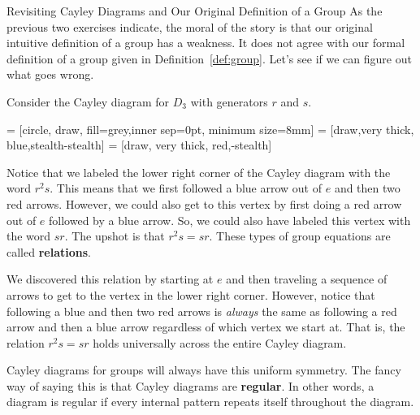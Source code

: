 \begin{section}{Revisiting Cayley Diagrams and Our Original Definition of a Group}
As the previous two exercises indicate, the moral of the story is that our original intuitive definition of a group has a weakness.  It does not agree with our formal definition of a group given in Definition~\ref{def:group}.  Let's see if we can figure out what goes wrong.

Consider the Cayley diagram for \(D_3\) with generators \(r\) and \(s\).

 = [circle, draw, fill=grey,inner sep=0pt, minimum size=8mm]
 = [draw,very  thick, blue,stealth-stealth]
 = [draw, very thick, red,-stealth]

\begin{center}
\end{center}

\noindent Notice that we labeled the lower right corner of the Cayley diagram with the word \(r^2s\).  This means that we first followed a blue arrow out of \(e\) and then two red arrows.  However, we could also get to this vertex by first doing a red arrow out of \(e\) followed by a blue arrow.  So, we could also have labeled this vertex with the word \(sr\).  The upshot is that \(r^2s=sr\).  These types of group equations are called \textbf{relations}.

We discovered this relation by starting at \(e\) and then traveling a sequence of arrows to get to the vertex in the lower right corner.  However, notice that following a blue and then two red arrows is \emph{always} the same as following a red arrow and then a blue arrow regardless of which vertex we start at.  That is, the relation \(r^2s=sr\) holds universally across the entire Cayley diagram.

Cayley diagrams for groups will always have this uniform symmetry.  The fancy way of saying this is that Cayley diagrams are \textbf{regular}.  In other words, a diagram is regular if every internal pattern repeats itself throughout the diagram.


\end{section}
